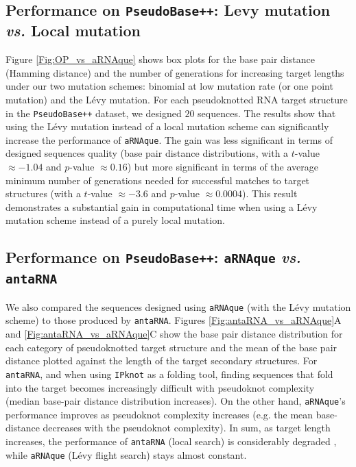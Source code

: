 \subsection{Performance on \texttt{PseudoBase++}: Levy mutation \emph{vs.} Local mutation}
Figure \ref{Fig:OP_vs_aRNAque} shows box plots for the base pair distance (Hamming distance) and the number of generations for increasing target lengths under our two mutation schemes: binomial at low mutation rate (or one point mutation) and the Lévy mutation. For each pseudoknotted RNA target structure in the \texttt{PseudoBase++} dataset, we designed $20$ sequences.  The results show that using the Lévy mutation instead of a local mutation scheme can significantly increase the performance of \texttt{aRNAque}.  The gain was less significant in terms of designed sequences quality  (base pair distance distributions, with a $t$-value $\approx -1.04$ and $p$-value $\approx 0.16$) but more significant in terms of the average minimum number of generations needed for successful matches to target structures (with a $t$-value $\approx -3.6$ and $p$-value $\approx 0.0004$). This result demonstrates a substantial gain in computational time when using a Lévy mutation scheme instead of a purely local mutation.

\subsection{Performance on \texttt{PseudoBase++}: \texttt{aRNAque} \emph{vs.} \texttt{antaRNA}}

We also compared the sequences designed using \texttt{aRNAque} (with the Lévy mutation scheme) to those produced by \texttt{antaRNA}. Figures \ref{Fig:antaRNA_vs_aRNAque}A and \ref{Fig:antaRNA_vs_aRNAque}C show the base pair distance distribution for each category of pseudoknotted target structure and the mean of the base pair distance plotted against the length of the target secondary structures. For \texttt{antaRNA}, and when using \texttt{IPknot} as a folding tool, finding sequences that fold into the target becomes increasingly difficult with pseudoknot complexity (median base-pair distance distribution increases). On the other hand, \texttt{aRNAque}’s performance improves as pseudoknot complexity increases (e.g. the mean base-distance decreases with the pseudoknot complexity). In sum, as target length increases, the performance of \texttt{antaRNA} (local search) is considerably degraded , while \texttt{aRNAque} (Lévy flight search) stays almost constant.


